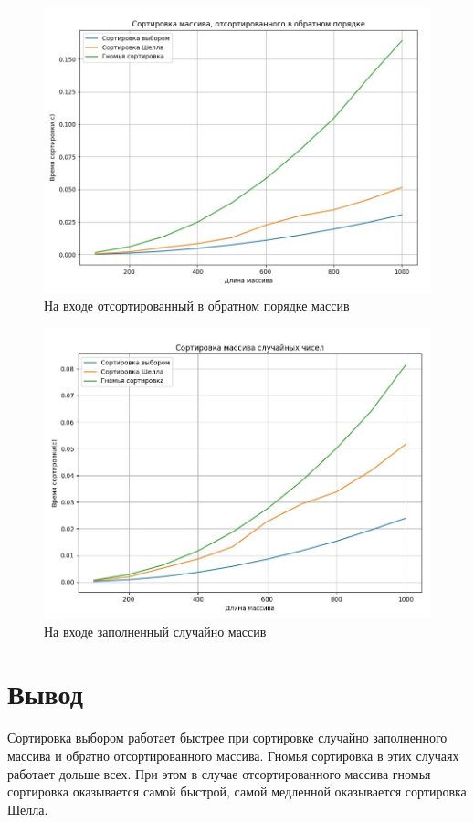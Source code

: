 \begin{figure}[H]
	\begin{center}
		\includegraphics[scale=0.4]{img/worst-type.jpg}
	\end{center}
	\captionsetup{justification=centering}
	\caption{На входе отсортированный в обратном порядке массив}
	\label{img:worst-type}
\end{figure}

\begin{figure}[H]
	\begin{center}
		\includegraphics[scale=0.4]{img/random-type.jpg}
	\end{center}
	\captionsetup{justification=centering}
	\caption{На входе заполненный случайно массив}
	\label{img:random-type}
\end{figure}

\section*{Вывод}

Сортировка выбором работает быстрее при сортировке случайно заполненного массива и обратно отсортированного массива. Гномья сортировка в этих случаях работает дольше всех. При этом в случае отсортированного массива гномья сортировка оказывается самой быстрой, самой медленной оказывается сортировка Шелла.